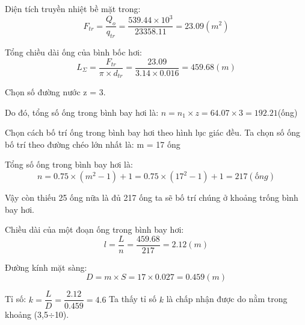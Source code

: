 Diện tích truyền nhiệt bề mặt trong:
\begin{equation*}
	F_{tr} = \dfrac{Q_{o}}{q_{tr}} = \dfrac{539.44 \times 10^{3}}{23358.11}=23.09(m^2)
\end{equation*}

Tổng chiều dài ống của bình bốc hơi:
\begin{equation*}
	L_{\Sigma} = \dfrac{F_{tr}}{\pi\times d_{tr}} = \dfrac{23.09}{3.14 \times 0.016}=459.68(m) 
\end{equation*}

Chọn số đường nước z = 3.

Do đó, tổng số ống trong bình bay hơi là: $n = n_{1}\times z = 64.07 \times 3=192.21$(ống)

Chọn cách bố trí ống trong bình bay hơi theo hình lục giác đều. Ta chọn số ống bố trí theo đường chéo lớn nhất là: m = 17 ống

Tổng số ống trong bình bay hơi là:
\begin{equation*}
	n = 0.75\times(m^2 - 1) + 1 = 0.75 \times (17^2-1)+1=217(ống)
\end{equation*}

Vậy còn thiếu 25 ống nữa là đủ 217 ống ta sẽ bố trí chúng ở khoảng trống bình bay hơi.

Chiều dài của một đoạn ống trong bình bay hơi:
\begin{equation*}
	l = \dfrac{L}{n} = \dfrac{459.68}{217}=2.12(m)
\end{equation*}

Đường kính mặt sàng:
\begin{equation*}
	D = m\times S = 17 \times 0.027=0.459(m)
\end{equation*}

Tỉ số: $k = \dfrac{L}{D} = \dfrac{2.12}{0.459}= 4.6$
Ta thấy tỉ số $k$ là chấp nhận được do nằm trong khoảng (3,5$\div$10).

